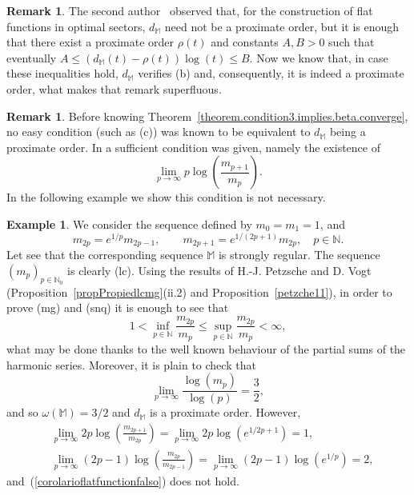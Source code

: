 \documentclass[11pt,a4paper]{article}
\theoremstyle{definition}
\newtheorem{rema}[theo]{Remark}
\newtheorem{exam}[theo]{Example}
\def\oo{\infty}
\def\ri{\rightarrow}
\def\o{\omega}
\def\ro{\rho}
\def\N{\mathbb{N}}
\def\M{\mathbb{M}}
\def\no{\nonumber}
\begin{document}
\begin{rema}
The second author~\cite[Remark\ 4.11(iii)]{SanzFlat} observed that, for the construction of flat functions in optimal sectors, $d_{\M}$ need not be a proximate order, but it is enough that there exist a proximate order $\ro(t)$ and constants $A,B>0$ such that eventually $A\le (d_{\M}(t)-\ro(t))\log(t)\le B$. Now we know that, in case these inequalities hold, $d_{\M}$ verifies (b) and, consequently, it is indeed a proximate order, what makes that remark superfluous.
\end{rema}


\begin{rema}
Before knowing Theorem~\ref{theorem.condition3.implies.beta.converge}, no easy condition (such as (c)) was known to be equivalent to $d_{\M}$ being a proximate order.
In \cite[Corollary\ 4.10]{SanzFlat} a sufficient condition was given, namely the existence of
  \begin{equation}
   \lim_{p\ri\oo} p\log\left(\frac{m_{p+1}}{m_{p}}\right). \label{corolarioflatfunctionfalso}
  \end{equation}
In the following example we show this condition is not necessary.
\end{rema}

\begin{exam}
We consider the sequence defined by $m_0=m_1=1$, and
$$
m_{2p}=e^{1/p}m_{2p-1},\qquad m_{2p+1}=e^{1/(2p+1)}m_{2p},\quad p\in\N.
$$
Let see that the corresponding sequence $\M$ is strongly regular.
The sequence $(m_p)_{p\in\N_0}$ is clearly (lc).
  Using the results of H.-J. Petzsche and D. Vogt (Proposition~\ref{propPropiedlcmg}(ii.2) and Proposition~\ref{petzche11}), in order to prove (mg) and (snq) it  is enough to see that
  $$1<\inf_{p\in\N}\frac{m_{2p}}{m_p}\leq\sup_{p\in\N}\frac{m_{2p}}{m_{p}}<\oo,$$
what may be done thanks to the well known behaviour of the partial sums of the harmonic series. Moreover, it is plain to check that
$$
\lim_{p\ri\oo} \frac{\log(m_p)}{\log(p)}=\frac{3}{2},
$$
and so $\o(\M)=3/2$ and $d_{\M}$ is a proximate order. However,
  \begin{align}
   &\lim_{p\ri\oo} 2p\log\left(\frac{m_{2p+1}}{m_{2p}}\right)=\lim_{p\ri\oo} 2p\log\left( e^{1/2p+1}\right)= 1 ,  \no\\
   &\lim_{p\ri\oo} (2p-1)\log\left(\frac{m_{2p}}{m_{2p-1}}\right)=\lim_{p\ri\oo} (2p-1)\log\left( e^{1/p}\right)= 2, \no
  \end{align}
and~(\ref{corolarioflatfunctionfalso}) does not hold.
 \end{exam}
\end{document}
